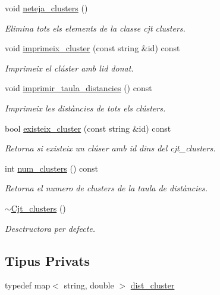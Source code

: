 \begin{DoxyCompactItemize}
void \hyperlink{class_cjt__clusters_a70aca86e77c34ce652d857b16cc2572f}{neteja\+\_\+clusters} ()
\begin{DoxyCompactList}\small\item\em Elimina tots els elements de la classe cjt clusters. \end{DoxyCompactList}\item 
void \hyperlink{class_cjt__clusters_a732366a2fd16153e162fd838d25b5a56}{imprimeix\+\_\+cluster} (const string \&id) const
\begin{DoxyCompactList}\small\item\em Imprimeix el clúster amb l\textquotesingle{}id donat. \end{DoxyCompactList}\item 
void \hyperlink{class_cjt__clusters_a2ee45d5dabc656adf8d7d356239f57c6}{imprimir\+\_\+taula\+\_\+distancies} () const
\begin{DoxyCompactList}\small\item\em Imprimeix les distàncies de tots els clústers. \end{DoxyCompactList}\item 
bool \hyperlink{class_cjt__clusters_af85ce29152ee18987f391a2d27af59b5}{existeix\+\_\+cluster} (const string \&id) const
\begin{DoxyCompactList}\small\item\em Retorna si existeix un clúser amb id dins del cjt\+\_\+clusters. \end{DoxyCompactList}\item 
int \hyperlink{class_cjt__clusters_a6a240452c7964e1d6b7d54df7ee58563}{num\+\_\+clusters} () const
\begin{DoxyCompactList}\small\item\em Retorna el numero de clusters de la taula de distàncies. \end{DoxyCompactList}\item 
\hyperlink{class_cjt__clusters_aba7f00077ce77ba7963ac8084be4a000}{$\sim$\+Cjt\+\_\+clusters} ()
\begin{DoxyCompactList}\small\item\em Desctructora per defecte. \end{DoxyCompactList}\end{DoxyCompactItemize}
\subsection*{Tipus Privats}
\begin{DoxyCompactItemize}
\item 
typedef map$<$ string, double $>$ \hyperlink{class_cjt__clusters_a9138a363184004ad38221f340abfccd5}{dist\+\_\+cluster}
\end{DoxyCompactItemize}
